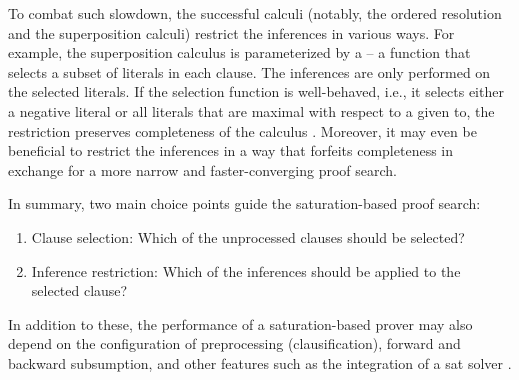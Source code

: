 To combat such slowdown, the successful calculi (notably, the ordered resolution and the superposition calculi) restrict the inferences in various ways.
For example, the superposition calculus is parameterized by a  -- a function that selects a subset of literals in each clause.
The inferences are only performed on the selected literals.
If the selection function is well-behaved,
i.e., it selects either a negative literal or all literals that are maximal with respect to a given \gls{to},
the restriction preserves completeness of the calculus \cite{DBLP:journals/logcom/BachmairG94}.
Moreover, it may even be beneficial to restrict the inferences in a way that forfeits completeness
in exchange for a more narrow and faster-converging proof search.

In summary, two main choice points guide the \gls{saturation}-based proof search:
\begin{enumerate}
\item Clause selection: Which of the unprocessed clauses should be selected?
\item Inference restriction: Which of the inferences should be applied to the selected clause?
\end{enumerate}

In addition to these, the performance of a saturation-based prover may also depend on the configuration of preprocessing (clausification), forward and backward subsumption, and other features such as the integration of a \gls{sat} solver \cite{DBLP:conf/cav/Voronkov14}.


